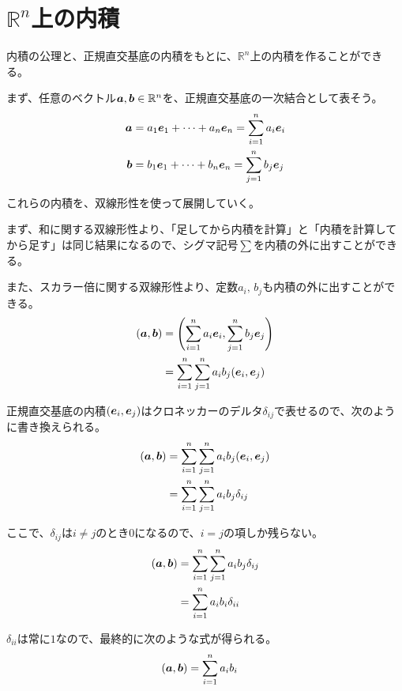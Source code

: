 \documentclass[../../../topic_linear-algebra]{subfiles}
\begin{document}
\sectionline
\section{$\mathbb{R}^n$上の内積}

内積の公理と、正規直交基底の内積をもとに、$\mathbb{R}^n$上の内積を作ることができる。

\br

まず、任意のベクトル$\vb*{a},\vb*{b} \in \mathbb{R}^n$を、正規直交基底の一次結合として表そう。
\begin{align*}
  \vb*{a} & = a_1 \vb*{e}_1 + \cdots + a_n \vb*{e}_n = \sum_{i=1}^n a_i \vb*{e}_i \\
  \vb*{b} & = b_1 \vb*{e}_1 + \cdots + b_n \vb*{e}_n = \sum_{j=1}^n b_j \vb*{e}_j
\end{align*}

これらの内積を、双線形性を使って展開していく。

\br

まず、和に関する双線形性より、「足してから内積を計算」と「内積を計算してから足す」は同じ結果になるので、シグマ記号$\sum$を内積の外に出すことができる。

また、スカラー倍に関する双線形性より、定数$a_i, \, b_j$も内積の外に出すことができる。
\begin{align*}
  (\vb*{a}, \vb*{b}) & = \Biggl( \sum_{i=1}^n a_i \vb*{e}_i, \sum_{j=1}^n b_j \vb*{e}_j \Biggr) \\
                     & = \sum_{i=1}^n \sum_{j=1}^n a_i b_j (\vb*{e}_i, \vb*{e}_j)
\end{align*}

正規直交基底の内積$(\vb*{e}_i, \vb*{e}_j)$はクロネッカーのデルタ$\delta_{ij}$で表せるので、次のように書き換えられる。
\begin{align*}
  (\vb*{a}, \vb*{b}) & = \sum_{i=1}^n \sum_{j=1}^n a_i b_j (\vb*{e}_i, \vb*{e}_j) \\
                     & = \sum_{i=1}^n \sum_{j=1}^n a_i b_j \delta_{ij}
\end{align*}

ここで、$\delta_{ij}$は$i \neq j$のとき$0$になるので、$i = j$の項しか残らない。
\begin{align*}
  (\vb*{a}, \vb*{b}) & = \sum_{i=1}^n \sum_{j=1}^n a_i b_j \delta_{ij} \\
                     & = \sum_{i=1}^n a_i b_i \delta_{ii}
\end{align*}

$\delta_{ii}$は常に$1$なので、最終的に次のような式が得られる。
\begin{align*}
  (\vb*{a}, \vb*{b}) & = \sum_{i=1}^n a_i b_i
\end{align*}
\end{document}
